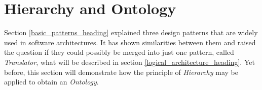 %
%
%
%
%
%
%

\section{Hierarchy and Ontology}
\label{hierarchy_and_ontology_heading}

Section \ref{basic_patterns_heading} explained three design patterns that are
widely used in software architectures. It has shown similarities between them
and raised the question if they could possibly be merged into just one pattern,
called \emph{Translator}, what will be described in section
\ref{logical_architecture_heading}.
Yet before, this section will demonstrate how the principle of \emph{Hierarchy}
may be applied to obtain an \emph{Ontology}.





